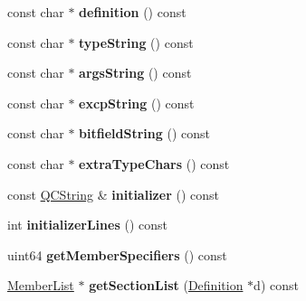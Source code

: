 \begin{DoxyCompactItemize}
\item 
\hypertarget{class_member_def_add42594d9a7e4e6c693a0a8062f8facc}{const char $\ast$ {\bfseries definition} () const }\label{class_member_def_add42594d9a7e4e6c693a0a8062f8facc}

\item 
\hypertarget{class_member_def_a716dc78d0795a1eff4d74b74b619c6b2}{const char $\ast$ {\bfseries type\-String} () const }\label{class_member_def_a716dc78d0795a1eff4d74b74b619c6b2}

\item 
\hypertarget{class_member_def_a68660344495cb352fd3dc59408045c4a}{const char $\ast$ {\bfseries args\-String} () const }\label{class_member_def_a68660344495cb352fd3dc59408045c4a}

\item 
\hypertarget{class_member_def_ae634cc305bc2c02b44a7e3721a1dd8cb}{const char $\ast$ {\bfseries excp\-String} () const }\label{class_member_def_ae634cc305bc2c02b44a7e3721a1dd8cb}

\item 
\hypertarget{class_member_def_a3bb35d09a74a2f637070b9edab3423fa}{const char $\ast$ {\bfseries bitfield\-String} () const }\label{class_member_def_a3bb35d09a74a2f637070b9edab3423fa}

\item 
\hypertarget{class_member_def_a52ddcff5d57c4e8007eb1527a9f2102c}{const char $\ast$ {\bfseries extra\-Type\-Chars} () const }\label{class_member_def_a52ddcff5d57c4e8007eb1527a9f2102c}

\item 
\hypertarget{class_member_def_ac3a6783cc1e75b1f8269e0ea4cbe54bf}{const \hyperlink{class_q_c_string}{Q\-C\-String} \& {\bfseries initializer} () const }\label{class_member_def_ac3a6783cc1e75b1f8269e0ea4cbe54bf}

\item 
\hypertarget{class_member_def_afcee1637a8950215bb35eb8ebda387b1}{int {\bfseries initializer\-Lines} () const }\label{class_member_def_afcee1637a8950215bb35eb8ebda387b1}

\item 
\hypertarget{class_member_def_a89485cc934a033fe0ff759e82e174fee}{uint64 {\bfseries get\-Member\-Specifiers} () const }\label{class_member_def_a89485cc934a033fe0ff759e82e174fee}

\item 
\hypertarget{class_member_def_a4cecfa66326b48ac26fbf475320f1825}{\hyperlink{class_member_list}{Member\-List} $\ast$ {\bfseries get\-Section\-List} (\hyperlink{class_definition}{Definition} $\ast$d) const }\label{class_member_def_a4cecfa66326b48ac26fbf475320f1825}


\end{DoxyCompactItemize}
